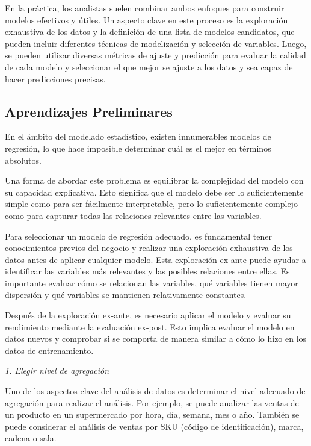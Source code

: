 \documentclass[
]{book}
\begin{document}
En la práctica, los analistas suelen combinar ambos enfoques para
construir modelos efectivos y útiles. Un aspecto clave en este proceso
es la exploración exhaustiva de los datos y la definición de una lista
de modelos candidatos, que pueden incluir diferentes técnicas de
modelización y selección de variables. Luego, se pueden utilizar
diversas métricas de ajuste y predicción para evaluar la calidad de cada
modelo y seleccionar el que mejor se ajuste a los datos y sea capaz de
hacer predicciones precisas.

\subsection{Aprendizajes Preliminares}\label{aprendizajes-preliminares}

En el ámbito del modelado estadístico, existen innumerables modelos de
regresión, lo que hace imposible determinar cuál es el mejor en términos
absolutos.

Una forma de abordar este problema es equilibrar la complejidad del
modelo con su capacidad explicativa. Esto significa que el modelo debe
ser lo suficientemente simple como para ser fácilmente interpretable,
pero lo suficientemente complejo como para capturar todas las relaciones
relevantes entre las variables.

Para seleccionar un modelo de regresión adecuado, es fundamental tener
conocimientos previos del negocio y realizar una exploración exhaustiva
de los datos antes de aplicar cualquier modelo. Esta exploración ex-ante
puede ayudar a identificar las variables más relevantes y las posibles
relaciones entre ellas. Es importante evaluar cómo se relacionan las
variables, qué variables tienen mayor dispersión y qué variables se
mantienen relativamente constantes.

Después de la exploración ex-ante, es necesario aplicar el modelo y
evaluar su rendimiento mediante la evaluación ex-post. Esto implica
evaluar el modelo en datos nuevos y comprobar si se comporta de manera
similar a cómo lo hizo en los datos de entrenamiento.

\emph{1. Elegir nivel de agregación}

Uno de los aspectos clave del análisis de datos es determinar el nivel
adecuado de agregación para realizar el análisis. Por ejemplo, se puede
analizar las ventas de un producto en un supermercado por hora, día,
semana, mes o año. También se puede considerar el análisis de ventas por
SKU (código de identificación), marca, cadena o sala.
\end{document}
